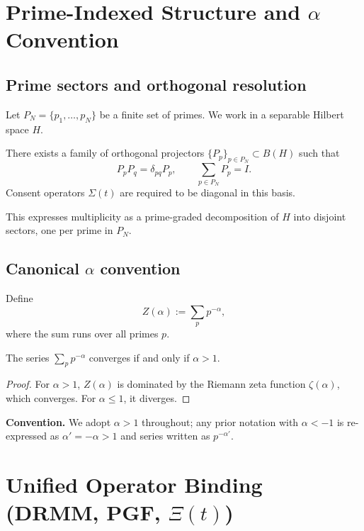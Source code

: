 \documentclass[11pt]{article}
\begin{document}
\section{Prime-Indexed Structure and $\alpha$ Convention}

\subsection{Prime sectors and orthogonal resolution}

Let $P_N = \{p_1, \dots, p_N\}$ be a finite set of primes. We work in a
separable Hilbert space $H$.

\begin{assumption}\label{ass:orthogonal}
There exists a family of orthogonal projectors $\{P_p\}_{p \in P_N} \subset B(H)$
such that
\[
P_p P_q = \delta_{pq} P_p,\qquad \sum_{p \in P_N} P_p = I.
\]
Consent operators $\Sigma(t)$ are required to be diagonal in this basis.
\end{assumption}

This expresses multiplicity as a prime-graded decomposition of $H$ into
disjoint sectors, one per prime in $P_N$.

\subsection{Canonical $\alpha$ convention}

\begin{definition}\label{def:prime-zeta}
Define
\[
Z(\alpha) := \sum_{p} p^{-\alpha},
\]
where the sum runs over all primes $p$.
\end{definition}

\begin{lemma}\label{lem:prime-zeta}
The series $\sum_{p} p^{-\alpha}$ converges if and only if $\alpha > 1$.
\end{lemma}

\begin{proof}
For $\alpha>1$, $Z(\alpha)$ is dominated by the Riemann zeta function
$\zeta(\alpha)$, which converges. For $\alpha \le 1$, it diverges.
\end{proof}

\noindent
\textbf{Convention.} We adopt $\alpha>1$ throughout; any prior notation with
$\alpha < -1$ is re-expressed as $\alpha' = -\alpha > 1$ and series written
as $p^{-\alpha'}$.

\section{Unified Operator Binding (DRMM, PGF, $\Xi(t)$)}
\end{document}
